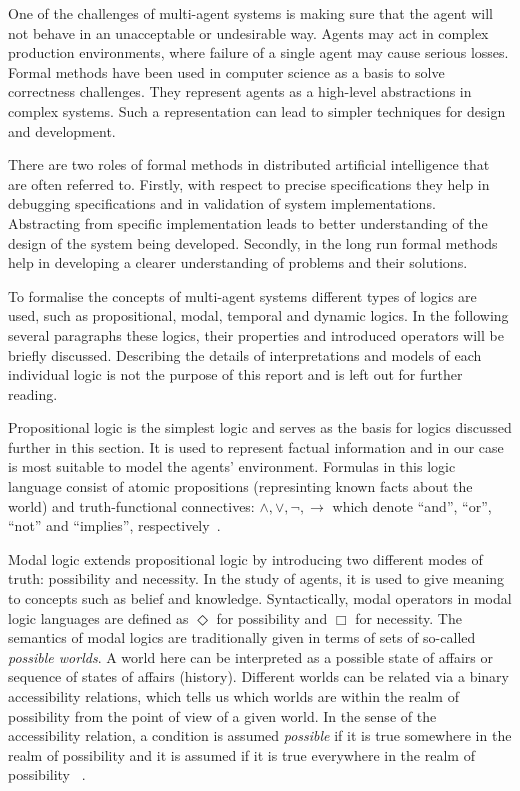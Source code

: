One of the challenges of multi-agent systems is making sure that the agent will not behave in an unacceptable or undesirable way.
Agents may act in complex production environments, where failure of a single agent may cause serious losses.
Formal methods have been used in computer science as a basis to solve correctness challenges.
They represent agents as a high-level abstractions in complex systems.
Such a representation can lead to simpler techniques for design and development.

There are two roles of formal methods in distributed artificial intelligence that are often referred to.
Firstly, with respect to precise specifications they help in debugging specifications and in validation of system implementations.
Abstracting from specific implementation leads to better understanding of the design of the system being developed.
Secondly, in the long run formal methods help in developing a clearer understanding of problems and their solutions. \cite{Singh_99}

To formalise the concepts of multi-agent systems different types of logics are used, such as propositional, modal, temporal and dynamic logics.
In the following several paragraphs these logics, their properties and introduced operators will be briefly discussed.
Describing the details of interpretations and models of each individual logic is not the purpose of this report and is left out for further reading.

Propositional logic is the simplest logic and serves as the basis for logics discussed further in this section.
It is used to represent factual information and in our case is most suitable to model the agents' environment.
Formulas in this logic language consist of atomic propositions (represinting known facts about the world) and truth-functional connectives: $\land,\lor,\neg,\rightarrow$ which denote \enquote{and}, \enquote{or}, \enquote{not} and \enquote{implies}, respectively~\cite{Enderton_72}.

Modal logic extends propositional logic by introducing two different modes of truth: possibility and necessity.
In the study of agents, it is used to give meaning to concepts such as belief and knowledge.
Syntactically, modal operators in modal logic languages are defined as $\Diamond$  for possibility and $\Box$ for necessity.
The semantics of modal logics are traditionally given in terms of sets of so-called \emph{possible worlds}.
A world here can be interpreted as a possible state of affairs or sequence of states of affairs (history).
Different worlds can be related via a binary accessibility relations, which tells us which worlds are within the realm of possibility from the point of view of a given world.
In the sense of the accessibility relation, a condition is assumed \emph{possible} if it is true somewhere in the realm of possibility and it is assumed  if it is true everywhere in the realm of possibility~ \cite{Saul_63}.

